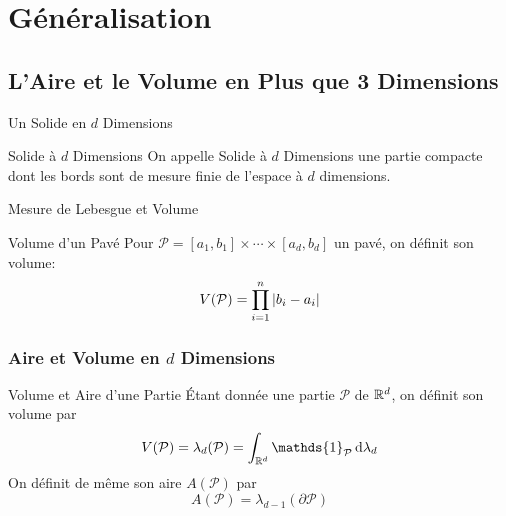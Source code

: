 \documentclass{../beamercours}
\begin{document}
\section{Généralisation}

\subsection{L'Aire et le Volume en Plus que 3 Dimensions}
\begin{frame}{Un Solide en $d$ Dimensions}
    \begin{définition}
        {Solide à $d$ Dimensions}{}
        On appelle Solide à $d$ Dimensions une partie compacte dont les bords sont de mesure finie de l'espace à $d$ dimensions.
    \end{définition}    
\end{frame}

\begin{frame}{Mesure de Lebesgue et Volume}
    \begin{définition}
        {Volume d'un Pavé}{}
        Pour $\mathcal{P} = [a_{1}, b_{1}] \times \cdots \times [a_{d}, b_{d}]$ un pavé, on définit son volume:
        \[
            V(\mathcal{P}) = \prod_{i = 1}^{n} \left|b_{i} - a_{i}\right|
        \]
    \end{définition}
\end{frame}
\begin{frame}
    \frametitle{Aire et Volume en $d$ Dimensions}
    \begin{définition}
        {Volume et Aire d'une Partie}{}
        Étant donnée une partie $\mathcal{P}$ de $\mathbb{R}^{d}$, on définit son volume par 
        \begin{equation*}
            V(\mathcal{P}) = \lambda_{d}(\mathcal{P}) =  \int_{\R^{d}} \mathds{1}_{\mathcal{P}}\d\lambda_{d}
        \end{equation*}
        On définit de même son aire $A(\mathcal{P})$ par 
        \begin{equation*}
            A(\mathcal{P}) = \lambda_{d - 1}(\partial\mathcal{P})
        \end{equation*}
    \end{définition}
\end{frame}
\end{document}
